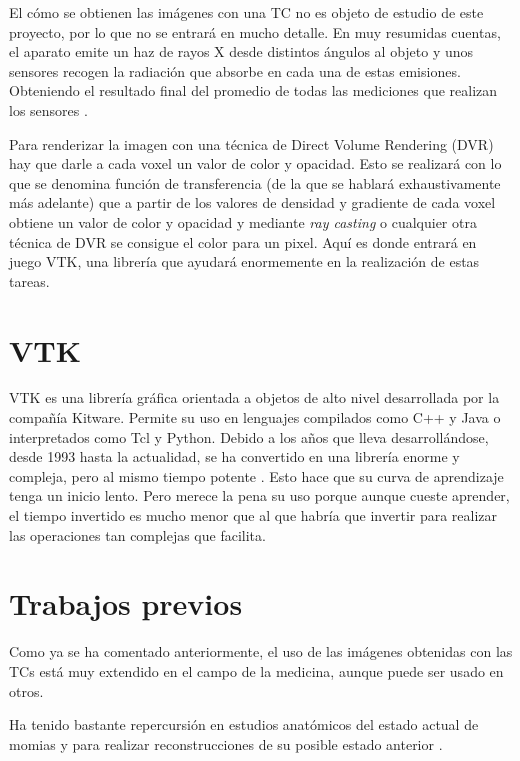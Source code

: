 El cómo se obtienen las imágenes con una TC no es objeto de estudio de este proyecto, por lo que no se entrará en mucho detalle. En muy resumidas cuentas, el aparato emite un haz de rayos X desde distintos ángulos al objeto y unos sensores recogen la radiación que absorbe en cada una de estas emisiones. Obteniendo el resultado final del promedio de todas las mediciones que realizan los sensores \cite{tac}. 

Para renderizar la imagen con una técnica de Direct Volume Rendering (DVR) hay que darle a cada voxel un valor de color y opacidad. Esto se realizará con lo que se denomina función de transferencia (de la que se hablará exhaustivamente más adelante) que a partir de los valores de densidad y gradiente de cada voxel obtiene un valor de color y opacidad y mediante \textit{ray casting} o cualquier otra técnica de DVR se consigue el color para un pixel. Aquí es donde entrará en juego VTK, una librería que ayudará enormemente en la realización de estas tareas.

\section{VTK} 

VTK es una librería gráfica orientada a objetos de alto nivel desarrollada por la compañía Kitware. Permite su uso en lenguajes compilados como C++ y Java o interpretados como Tcl y Python. Debido a los años que lleva desarrollándose, desde 1993 hasta la actualidad, se ha convertido en una librería enorme y compleja, pero al mismo tiempo potente \cite{intro_medical_vtk_bioimage}. Esto hace que su curva de aprendizaje tenga un inicio lento. Pero merece la pena su uso porque aunque cueste aprender, el tiempo invertido es mucho menor que al que habría que invertir para realizar las operaciones tan complejas que facilita.

\section{Trabajos previos}

Como ya se ha comentado anteriormente, el uso de las imágenes obtenidas con las TCs está muy extendido en el campo de la medicina, aunque puede ser usado en otros. 

Ha tenido bastante repercursión en estudios anatómicos del estado actual de momias \cite{mummies} y para realizar reconstrucciones de su posible estado anterior \cite{mummies_reconstruction}.

